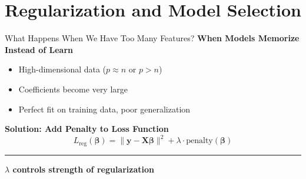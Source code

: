 \documentclass[8pt,aspectratio=169]{beamer}
\newcommand{\bottomnote}[1]{%
\vfill
\vspace{-2mm}
\textcolor{mllavender2}{\rule{\textwidth}{0.4pt}}
\vspace{1mm}
\footnotesize
\textbf{#1}
}
\begin{document}
\section{Regularization and Model Selection}

\begin{frame}[t]{What Happens When We Have Too Many Features?}
  \textbf{When Models Memorize Instead of Learn}

  \begin{itemize}
    \item High-dimensional data ($p \approx n$ or $p > n$)
    \item Coefficients become very large
    \item Perfect fit on training data, poor generalization
  \end{itemize}

  \vspace{0.5em}
  \textbf{Solution: Add Penalty to Loss Function}
  \begin{equation}
    L_{\text{reg}}(\boldsymbol{\beta}) = \|\mathbf{y} - \mathbf{X}\boldsymbol{\beta}\|^2 + \lambda \cdot \text{penalty}(\boldsymbol{\beta})
  \end{equation}

  \bottomnote{$\lambda$ controls strength of regularization}
\end{frame}
\end{document}
